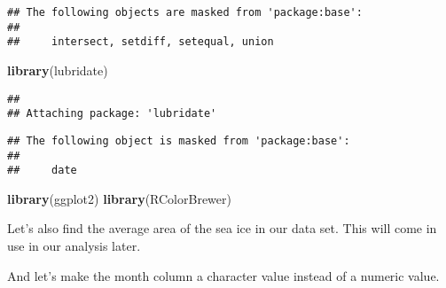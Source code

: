 \documentclass[]{article}
\newenvironment{Shaded}{\begin{snugshade}}{\end{snugshade}}
\newcommand{\KeywordTok}[1]{\textcolor[rgb]{0.13,0.29,0.53}{\textbf{#1}}}
\newcommand{\StringTok}[1]{\textcolor[rgb]{0.31,0.60,0.02}{#1}}
\newcommand{\OperatorTok}[1]{\textcolor[rgb]{0.81,0.36,0.00}{\textbf{#1}}}
\newcommand{\NormalTok}[1]{#1}
\begin{document}
\begin{verbatim}
## The following objects are masked from 'package:base':
## 
##     intersect, setdiff, setequal, union
\end{verbatim}

\begin{Shaded}
\begin{Highlighting}[]
\KeywordTok{library}\NormalTok{(lubridate)}
\end{Highlighting}
\end{Shaded}

\begin{verbatim}
## 
## Attaching package: 'lubridate'
\end{verbatim}

\begin{verbatim}
## The following object is masked from 'package:base':
## 
##     date
\end{verbatim}

\begin{Shaded}
\begin{Highlighting}[]
\KeywordTok{library}\NormalTok{(ggplot2)}
\KeywordTok{library}\NormalTok{(RColorBrewer)}
\end{Highlighting}
\end{Shaded}

Let's also find the average area of the sea ice in our data set. This
will come in use in our analysis later.

\begin{Shaded}
\end{Shaded}

And let's make the month column a character value instead of a numeric
value.

\begin{Shaded}
\end{Shaded}
\end{document}

